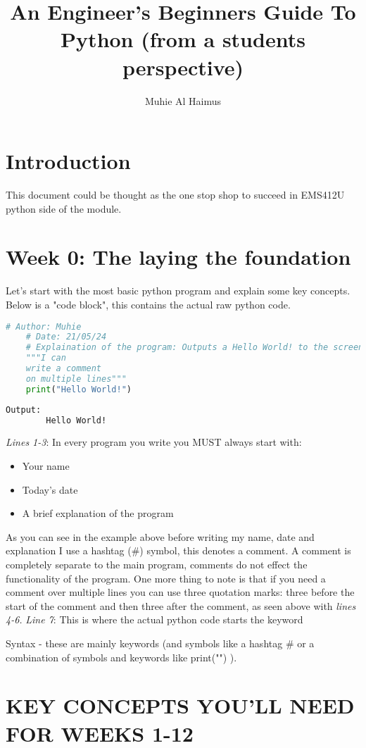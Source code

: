 \documentclass{article}
\title{An Engineer's Beginners Guide To Python (from a students perspective)}
\author{Muhie Al Haimus}
\begin{document}
	\maketitle
	\section{Introduction}
	This document could be thought as the one stop shop to succeed in EMS412U python side of the module.  
	 \section{Week 0: The laying the foundation}
	 Let's start with the most basic python program and explain some key concepts. Below is a "code block", this contains the actual raw python code.
	 
	\begin{lstlisting}[language=Python]
	# Author: Muhie
	# Date: 21/05/24
	# Explaination of the program: Outputs a Hello World! to the screen
	"""I can
	write a comment 
	on multiple lines"""
	print("Hello World!")
	\end{lstlisting}
	\begin{lstlisting}[language=Bash]
		Output:
		Hello World!
	\end{lstlisting}
	\emph{Lines 1-3}: In every program you write you MUST always start with:
	\begin{itemize}
		\item{Your name}
		\item{Today's date}
		\item{A brief explanation of the program}
	\end{itemize}
	As you can see in the example above before writing my name, date and explanation I use a hashtag (\#) symbol, this denotes a comment. A comment is completely separate to the main program, comments do not effect the functionality of the program. One more thing to note is that if you need a comment over multiple lines you can use three quotation marks: three before the start of the comment and then three after the comment, as seen above with \emph{lines 4-6.}
	\vspace{2mm}
	\emph{Line 7}: This is where the actual python code starts the keyword  
	
	
	 Syntax - these are mainly keywords (and symbols like a hashtag \# or a combination of symbols and keywords like print("") ).
	 
	 
	 \section{KEY CONCEPTS YOU'LL NEED FOR WEEKS 1-12}
\end{document}
